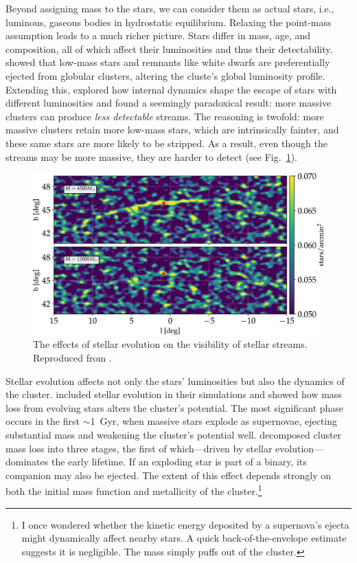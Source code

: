             Beyond assigning mass to the stars, we can consider them as actual stars, i.e., luminous, gaseous bodies in hydrostatic equilibrium. Relaxing the point-mass assumption leads to a much richer picture. Stars differ in mass, age, and composition, all of which affect their luminosities and thus their detectability. \citet{2008A&A...490..151K} showed that low-mass stars and remnants like white dwarfs are preferentially ejected from globular clusters, altering the cluste's global luminosity profile. Extending this, \citet{2018MNRAS.474.2479B} explored how internal dynamics shape the escape of stars with different luminosities and found a seemingly paradoxical result: more massive clusters can produce \textit{less detectable} streams. The reasoning is twofold: more massive clusters retain more low-mass stars, which are intrinsically fainter, and these same stars are more likely to be stripped. As a result, even though the streams may be more massive, they are harder to detect (see Fig.~\ref{fig:balbinot-2018}).
            \begin{figure}
                \includegraphics[width=\linewidth]{images/balbinot-2018.jpeg}
                \caption{The effects of stellar evolution on the visibility of stellar streams. Reproduced from \citep{2018MNRAS.474.2479B}.}
                \label{fig:balbinot-2018}
            \end{figure}

            Stellar evolution affects not only the stars' luminosities but also the dynamics of the cluster. \citet{2018MNRAS.474.2479B} included stellar evolution in their simulations and showed how mass loss from evolving stars alters the cluster's potential. The most significant phase occurs in the first $\sim$1~Gyr, when massive stars explode as supernovae, ejecting substantial mass and weakening the cluster's potential well. \citet{2010MNRAS.409..305L} decomposed cluster mass loss into three stages, the first of which—driven by stellar evolution—dominates the early lifetime. If an exploding star is part of a binary, its companion may also be ejected. The extent of this effect depends strongly on both the initial mass function and metallicity of the cluster.\footnote{I once wondered whether the kinetic energy deposited by a supernova's ejecta might dynamically affect nearby stars. A quick back-of-the-envelope estimate suggests it is negligible. The mass simply puffs out of the cluster.}
